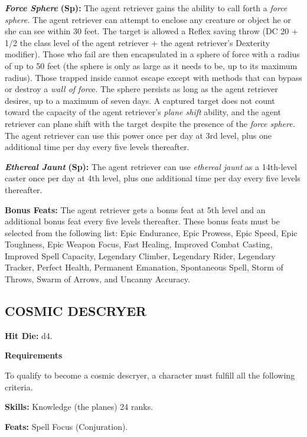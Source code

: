 \documentclass{article}
\begin{document}
\textit{\textbf{Force Sphere }}\textbf{(Sp):} The agent retriever gains the ability 
to call forth a \textit{force sphere. }The agent retriever can attempt to enclose 
any creature or object he or she can see within 30 feet. The target is allowed 
a Reflex saving throw (DC 20 + 1/2 the class level of the agent retriever + the 
agent retriever's Dexterity modifier). Those who fail are then encapsulated in 
a sphere of force with a radius of up to 50 feet (the sphere is only as large as 
it needs to be, up to its maximum radius). Those trapped inside cannot escape except 
with methods that can bypass or destroy a \textit{wall of forc}e. The sphere persists 
as long as the agent retriever desires, up to a maximum of seven days. A captured 
target does not count toward the capacity of the agent retriever's \textit{plane 
shift }ability, and the agent retriever can plane shift with the target despite 
the presence of the \textit{force sphere. }The agent retriever can use this power 
once per day at 3rd level, plus one additional time per day every five levels thereafter. 

\textit{\textbf{Ethereal Jaunt }}\textbf{(Sp):} The agent retriever can use \textit{ethereal 
jaunt }as a 14th-level caster once per day at 4th level, plus one additional time 
per day every five levels thereafter. 

\textbf{Bonus Feats:} The agent retriever gets a bonus feat at 5th level and an 
additional bonus feat every five levels thereafter. These bonus feats must be selected 
from the following list: Epic Endurance, Epic Prowess, Epic Speed, Epic Toughness, 
Epic Weapon Focus, Fast Healing, Improved Combat Casting, Improved Spell Capacity, 
Legendary Climber, Legendary Rider, Legendary Tracker, Perfect Health, Permanent 
Emanation, Spontaneous Spell, Storm of Throws, Swarm of Arrows, and Uncanny Accuracy. 

\vspace{12pt}
\subsection*{{\LARGE{}COSMIC DESCRYER}}

\textbf{Hit Die:} d4. 

\textbf{Requirements}

To qualify to become a cosmic descryer, a character must fulfill all the following 
criteria. 

\textbf{Skills:} Knowledge (the planes) 24 ranks. 

\textbf{Feats:} Spell Focus (Conjuration). 
\end{document}
